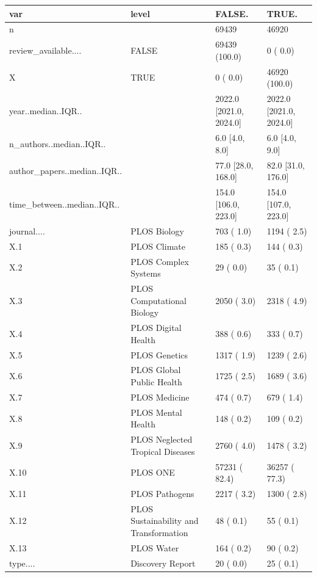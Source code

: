\begin{table}[ht]
\centering
\begin{tabular}{llll}
 var & level & FALSE. & TRUE. \\ 
  \hline
n &  &  69439 &  46920 \\ 
  review\_available.... & FALSE &  69439 (100.0)  &      0 (  0.0)  \\ 
  X & TRUE &      0 (  0.0)  &  46920 (100.0)  \\ 
  year..median..IQR.. &  & 2022.0 [2021.0, 2024.0] & 2022.0 [2021.0, 2024.0] \\ 
  n\_authors..median..IQR.. &  &    6.0 [4.0, 8.0] &    6.0 [4.0, 9.0] \\ 
  author\_papers..median..IQR.. &  &   77.0 [28.0, 168.0] &   82.0 [31.0, 176.0] \\ 
  time\_between..median..IQR.. &  &  154.0 [106.0, 223.0] &  154.0 [107.0, 223.0] \\ 
  journal.... & PLOS Biology &    703 (  1.0)  &   1194 (  2.5)  \\ 
  X.1 & PLOS Climate &    185 (  0.3)  &    144 (  0.3)  \\ 
  X.2 & PLOS Complex Systems &     29 (  0.0)  &     35 (  0.1)  \\ 
  X.3 & PLOS Computational Biology &   2050 (  3.0)  &   2318 (  4.9)  \\ 
  X.4 & PLOS Digital Health &    388 (  0.6)  &    333 (  0.7)  \\ 
  X.5 & PLOS Genetics &   1317 (  1.9)  &   1239 (  2.6)  \\ 
  X.6 & PLOS Global Public Health &   1725 (  2.5)  &   1689 (  3.6)  \\ 
  X.7 & PLOS Medicine &    474 (  0.7)  &    679 (  1.4)  \\ 
  X.8 & PLOS Mental Health &    148 (  0.2)  &    109 (  0.2)  \\ 
  X.9 & PLOS Neglected Tropical Diseases &   2760 (  4.0)  &   1478 (  3.2)  \\ 
  X.10 & PLOS ONE &  57231 ( 82.4)  &  36257 ( 77.3)  \\ 
  X.11 & PLOS Pathogens &   2217 (  3.2)  &   1300 (  2.8)  \\ 
  X.12 & PLOS Sustainability and Transformation &     48 (  0.1)  &     55 (  0.1)  \\ 
  X.13 & PLOS Water &    164 (  0.2)  &     90 (  0.2)  \\ 
  type.... & Discovery Report &     20 (  0.0)  &     25 (  0.1)  \\ 

\end{tabular}
\end{table}
